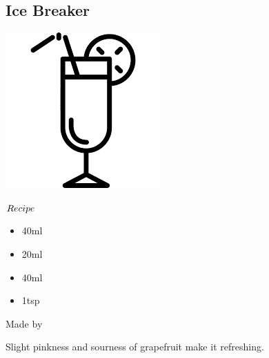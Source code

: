 \subsection{Ice Breaker}
\vspace{-7mm}
\hspace{35mm}
\includegraphics[scale=.07]{cocktail_glass_tall.png}
\vspace{2.5mm}
\begin{itembox}[l]{\boldmath $Recipe$}
\begin{itemize}
\setlength{\parskip}{0cm}
\setlength{\itemsep}{0cm}
\item \teq 40ml
\item \wc 20ml
\item \gj 40ml
\item \gs 1tsp
\end{itemize}
\vspace{-4mm}
Made by \shake
\end{itembox}
Slight pinkness and sourness of grapefruit make it refreshing.
